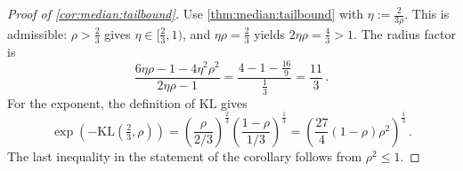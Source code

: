 \documentclass{article}
\newcommand{\lb}{\left(} %
\newcommand{\rb}{\right)} %
\newcommand{\br}[1]{\lb #1 \rb} %
\newcommand{\brOf}[1]{\!\br{#1}} %
\newcommand{\eqfs}{\,.}
\newcommand{\kullback}{\mathrm{K\!L}} %
\begin{document}
%
\begin{proof}[Proof of \cref{cor:median:tailbound}]
    Use \cref{thm:median:tailbound} with $\eta := \frac{2}{3\rho}$.
    This is admissible: $\rho > \frac23$ gives $\eta \in [\frac23, 1)$, and $\eta\rho = \frac23$ yields $2\eta\rho = \frac43 > 1$. The radius factor is
    \begin{equation}
        \frac{6\eta\rho - 1 - 4\eta^2\rho^2}{2\eta\rho-1}
        =
        \frac{4 - 1 - \frac{16}9}{\frac13}
        =
        \frac{11}{3}
        \eqfs
    \end{equation}
    For the exponent, the definition of $\kullback$ gives
    \begin{equation}
        \exp\brOf{-\kullback\brOf{\tfrac23, \rho}}
        =
        \br{\frac{\rho}{2/3}}^{\frac23} \br{\frac{1-\rho}{1/3}}^{\frac13}
        =
        \br{\frac{27}{4} (1-\rho) \rho^2}^{\frac13}
        \eqfs
    \end{equation}
    The last inequality in the statement of the corollary follows from $\rho^2 \leq 1$.
\end{proof}
%
%
%
\end{document}
